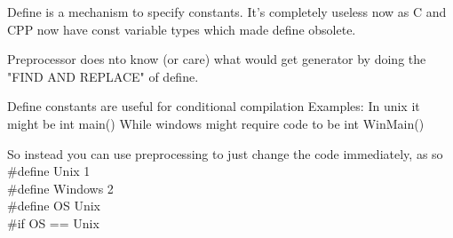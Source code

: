 \documentclass[12pt,oneside,fleqn]{book}
\begin{document}
Define is a mechanism to specify constants.
It's completely useless now as C and CPP now have const variable types which made define obsolete.

Preprocessor does nto know (or care) what would get generator by doing the "FIND AND REPLACE" of define.

Define constants are useful for conditional compilation
Examples:
In unix it might be
int main()
While windows might require code to be
int WinMain()

So instead you can use preprocessing to just change the code immediately, as so \\
\#define Unix 1 \\
\#define Windows 2 \\
\#define OS Unix \\
\#if OS == Unix \\
\end{document}
